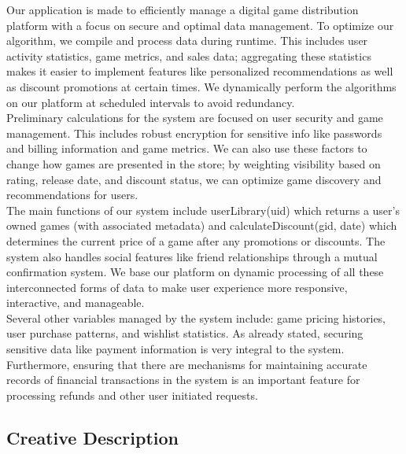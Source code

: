 \documentclass[12pt, oneside]{article}
\begin{document}
Our application is made to efficiently manage a digital game distribution platform with a focus on secure and optimal data management. To optimize our algorithm, we compile and process data during runtime. This includes user activity statistics, game metrics, and sales data; aggregating these statistics makes it easier to implement features like personalized recommendations as well as discount promotions at certain times. We dynamically perform the algorithms on our platform at scheduled intervals to avoid redundancy.
\vspace{0.5em}
\\
\noindent Preliminary calculations for the system are focused on user security and game management. This includes robust encryption for sensitive info like passwords and billing information and game metrics. We can also use these factors to change how games are presented in the store; by weighting visibility based on rating, release date, and discount status, we can optimize game discovery and recommendations for users. 
\vspace{0.5em}
\\
\noindent The main functions of our system include userLibrary(uid) which returns a user’s owned games (with associated metadata) and calculateDiscount(gid, date) which determines the current price of a game after any promotions or discounts. The system also handles social features like friend relationships through a mutual confirmation system. We base our platform on dynamic processing of all these interconnected forms of data to make user experience more responsive, interactive, and manageable. 
\vspace{0.5em}
\\
\noindent Several other variables managed by the system include: game pricing histories, user purchase patterns, and wishlist statistics. As already stated, securing sensitive data like payment information is very integral to the system. Furthermore, ensuring that there are mechanisms for maintaining accurate records of financial transactions in the system is an important feature for processing refunds and other user initiated requests.


\subsection{Creative Description}
\end{document}
